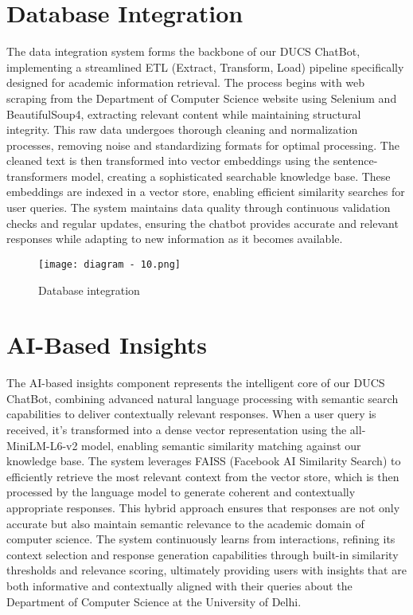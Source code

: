 \documentclass[12pt,a4paper]{report}
\begin{document}
\section{Database Integration}
The data integration system forms the backbone of our DUCS ChatBot, implementing a streamlined ETL (Extract, Transform, Load) pipeline specifically designed for academic information retrieval. The process begins with web scraping from the Department of Computer Science website using Selenium and BeautifulSoup4, extracting relevant content while maintaining structural integrity. This raw data undergoes thorough cleaning and normalization processes, removing noise and standardizing formats for optimal processing. The cleaned text is then transformed into vector embeddings using the sentence-transformers model, creating a sophisticated searchable knowledge base. These embeddings are indexed in a vector store, enabling efficient similarity searches for user queries. The system maintains data quality through continuous validation checks and regular updates, ensuring the chatbot provides accurate and relevant responses while adapting to new information as it becomes available.

\begin{figure}
    \centering
    \texttt{[image: diagram - 10.png]}
    \caption{Database integration}
    \label{fig:Data Integration}
\end{figure}

\section{AI-Based Insights}
The AI-based insights component represents the intelligent core of our DUCS ChatBot, combining advanced natural language processing with semantic search capabilities to deliver contextually relevant responses. When a user query is received, it's transformed into a dense vector representation using the all-MiniLM-L6-v2 model, enabling semantic similarity matching against our knowledge base. The system leverages FAISS (Facebook AI Similarity Search) to efficiently retrieve the most relevant context from the vector store, which is then processed by the language model to generate coherent and contextually appropriate responses. This hybrid approach ensures that responses are not only accurate but also maintain semantic relevance to the academic domain of computer science. The system continuously learns from interactions, refining its context selection and response generation capabilities through built-in similarity thresholds and relevance scoring, ultimately providing users with insights that are both informative and contextually aligned with their queries about the Department of Computer Science at the University of Delhi.
\end{document}
